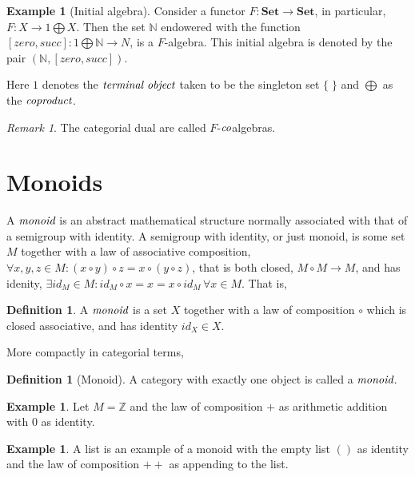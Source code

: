 \documentclass[10pt, oneside, reqno]{amsart}
\theoremstyle{plain}%
\theoremstyle{definition}
\newtheorem{defn}[thm]{Definition}
\newtheorem{exmp}[thm]{Example}
\theoremstyle{remark}
\newtheorem*{rem}{Remark}
\newcommand{\N}{\mathbb{N}}
\newcommand{\Z}{\mathbb{Z}}
\newcommand{\Id}{\mathit{id}_}
\begin{document}
\begin{exmp}[Initial algebra]
 Consider a functor $F: \textbf{Set} \to \textbf{Set}$, in particular, $F: X \to 1 \bigoplus X$.
 Then the set $\N$ endowered with the function $[zero,succ]: 1 \bigoplus \N \to N$, is a $F$-algebra.
 This initial algebra is denoted by the pair $(\N, [zero,succ])$.
\end{exmp}

Here $1$ denotes the $\emph{terminal object}$ taken to be the singleton set $\{ \; \}$
and $\bigoplus$ as the $\emph{coproduct}$.

\begin{rem}
 The categorial dual are called $F$-$\emph{co}$algebras.
\end{rem}


\section{Monoids} %
\label{sec:monoids}
A $\emph{monoid}$ is an abstract mathematical structure normally associated with that of a semigroup with identity.
A semigroup with identity, or just monoid, is some set $M$ together with a law of associative composition,
$\forall x,y,z \in M : (x \circ y) \circ z = x \circ (y \circ z)$, that is both closed, $M \circ M \to M$,
and has idenity, $\exists \Id{M} \in M : \Id{M} \circ x = x = x \circ \Id{M} \, \forall x \in M$. That is,

\begin{defn}
 A $\emph{monoid}$ is a set $X$ together with a law of composition $\circ$
 which is closed associative, and has identity $\Id{X} \in X$.
\end{defn}

More compactly in categorial terms,
\begin{defn}[Monoid]
 A category with exactly one object is called a $\emph{monoid}$.
\end{defn}

\begin{exmp}
 Let $M = \Z$ and the law of composition $+$ as arithmetic addition with $0$ as identity.
\end{exmp}

\begin{exmp}
 A list is an example of a monoid with the empty list $()$ as identity and the law of composition $++$ as appending to the list.
\end{exmp}


\end{document}
